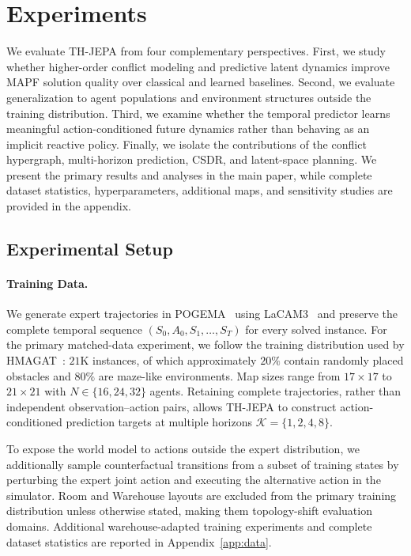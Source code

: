 \documentclass{article} %
\begin{document}
\section{Experiments}
\label{sec:experiments}

We evaluate TH-JEPA from four complementary perspectives. First, we study whether higher-order conflict modeling and predictive latent dynamics improve MAPF solution quality over classical and learned baselines. Second, we evaluate generalization to agent populations and environment structures outside the training distribution. Third, we examine whether the temporal predictor learns meaningful action-conditioned future dynamics rather than behaving as an implicit reactive policy. Finally, we isolate the contributions of the conflict hypergraph, multi-horizon prediction, CSDR, and latent-space planning. We present the primary results and analyses in the main paper, while complete dataset statistics, hyperparameters, additional maps, and sensitivity studies are provided in the appendix.

\subsection{Experimental Setup}
\label{sec:exp_setup}

\paragraph{Training Data.}
We generate expert trajectories in POGEMA~\cite{skrynnik2024pogema} using LaCAM3~\cite{okumura2024lacam3} and preserve the complete temporal sequence $(S_0,A_0,S_1,\ldots,S_T)$ for every solved instance. For the primary matched-data experiment, we follow the training distribution used by HMAGAT~\cite{jain2026hmagat}: $21$K instances, of which approximately $20\%$ contain randomly placed obstacles and $80\%$ are maze-like environments. Map sizes range from $17\times17$ to $21\times21$ with $N\in\{16,24,32\}$ agents. Retaining complete trajectories, rather than independent observation--action pairs, allows TH-JEPA to construct action-conditioned prediction targets at multiple horizons $\mathcal{K}=\{1,2,4,8\}$.

To expose the world model to actions outside the expert distribution, we additionally sample counterfactual transitions from a subset of training states by perturbing the expert joint action and executing the alternative action in the simulator. Room and Warehouse layouts are excluded from the primary training distribution unless otherwise stated, making them topology-shift evaluation domains. Additional warehouse-adapted training experiments and complete dataset statistics are reported in Appendix~\ref{app:data}.
\end{document}
